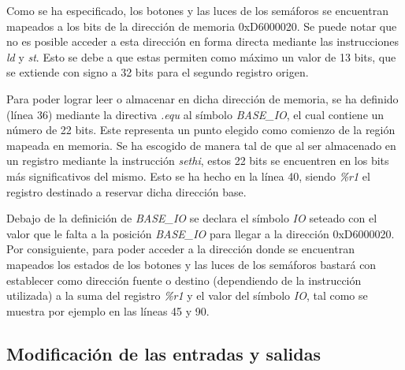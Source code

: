 \documentclass{article}
\begin{document}
	Como se ha especificado, los botones y las luces de los semáforos se encuentran mapeados a los bits de la dirección de memoria 0xD6000020. Se puede notar que no es posible acceder a esta dirección en forma directa mediante las instrucciones \textit{ld} y \textit{st}. Esto se debe a que estas permiten como máximo un valor de 13 bits, que se extiende con signo a 32 bits para el segundo registro origen.
	\par
	Para poder lograr leer o almacenar en dicha dirección de memoria, se ha definido (línea 36) mediante la directiva \textit{.equ} al símbolo \textit{BASE\_IO}, el cual contiene un número de 22 bits. Este representa un punto elegido como comienzo de la región mapeada en memoria. Se ha escogido de manera tal de que al ser almacenado en un registro mediante la instrucción \textit{sethi}, estos 22 bits se encuentren en los bits más significativos del mismo. Esto se ha hecho en la línea 40, siendo \textit{\%r1} el registro destinado a reservar dicha dirección base. 
	\par
	Debajo de la definición de \textit{BASE\_IO} se declara el símbolo \textit{IO}  seteado con el valor que le falta a la posición \textit{BASE\_IO} para llegar a la dirección 0xD6000020. Por consiguiente, para poder acceder a la dirección donde se encuentran mapeados los estados de los botones y las luces de los semáforos bastará con establecer como dirección fuente o destino (dependiendo de la instrucción utilizada) a la suma del registro \textit{\%r1} y el valor del símbolo \textit{IO}, tal como se muestra por ejemplo en las líneas 45 y 90.
	\bigskip\medskip



\subsection{Modificación de las entradas y salidas}
\medskip
\end{document}
